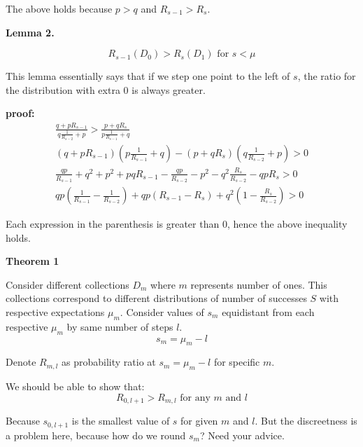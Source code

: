 \documentclass[11pt,draft]{article}
\begin{document}
The above holds because $p>q$ and $R_{s-1} > R_s$.

\textbf{Lemma 2.}

\[ R_{s-1}(D_0) > R_s(D_1)   \text{ for } s< \mu \]

This lemma essentially says that if we step one point to the left of $s$, the ratio for the distribution with extra $0$ is always greater.

\textbf{proof:}
 \begin{align}
 \frac{q + pR_{s-1}}{q\frac{1}{R_{s-2}} + p} > \frac{p+ qR_s}{p\frac{1}{R_{s-1}} + q} \\
(q + pR_{s-1})(p\frac{1}{R_{s-1}} + q)  - (p + qR_s)(q\frac{1}{R_{s-2}} + p) > 0 \\
\frac{qp}{R_{s-1}} + q^2 + p^2 + pqR_{s-1} - \frac{qp}{R_{s-2}} - p^2 - q^2\frac{R_s}{R_{s-2}} - qpR_s > 0 \\
qp ( \frac{1}{R_{s-1}}  - \frac{1}{R_{s-2}}) + qp(R_{s-1} - R_s) + q^2( 1 - \frac{R_s}{R_{s-2}}) > 0
\end{align}

Each expression in the parenthesis is greater than 0, hence the above inequality holds.
 
\textbf{Theorem 1}

Consider different collections $D_m$ where $m$ represents number of ones.   
This collections correspond to different distributions of number of successes $S$ with respective expectations $\mu_m$.
Consider values of $s_m$ equidistant from each respective $\mu_m$ by same number of steps $l$.
\[ s_m = \mu_m - l\]

Denote $R_{m,l}$ as probability ratio at $s_m=\mu_m-l$ for specific $m$.

We should be able to show that:
\[ R_{0,l+1} > R_{m,l}  \text{ for any } m \text{ and } l \]

Because $s_{0,l+1}$ is the smallest value of $s$ for given $m$ and $l$.  But the discreetness is a problem here, because how do we round $s_m$?
Need your advice.
\end{document}

